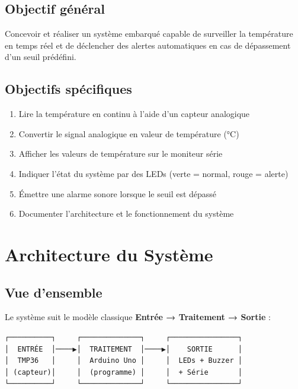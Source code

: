 \documentclass[12pt, a4paper]{article}
\begin{document}
\subsection{Objectif général}

Concevoir et réaliser un système embarqué capable de surveiller la température en temps réel et de déclencher des alertes automatiques en cas de dépassement d'un seuil prédéfini.

\subsection{Objectifs spécifiques}

\begin{enumerate}
    \item Lire la température en continu à l'aide d'un capteur analogique
    \item Convertir le signal analogique en valeur de température (°C)
    \item Afficher les valeurs de température sur le moniteur série
    \item Indiquer l'état du système par des LEDs (verte = normal, rouge = alerte)
    \item Émettre une alarme sonore lorsque le seuil est dépassé
    \item Documenter l'architecture et le fonctionnement du système
\end{enumerate}

\section{Architecture du Système}

\subsection{Vue d'ensemble}

Le système suit le modèle classique \textbf{Entrée → Traitement → Sortie} :

\begin{verbatim}
┌──────────┐     ┌──────────────┐     ┌────────────────┐
│  ENTRÉE  │────▶│  TRAITEMENT  │────▶│    SORTIE      │
│  TMP36   │     │  Arduino Uno │     │  LEDs + Buzzer │
│ (capteur)│     │  (programme) │     │  + Série       │
└──────────┘     └──────────────┘     └────────────────┘
\end{verbatim}
\end{document}
